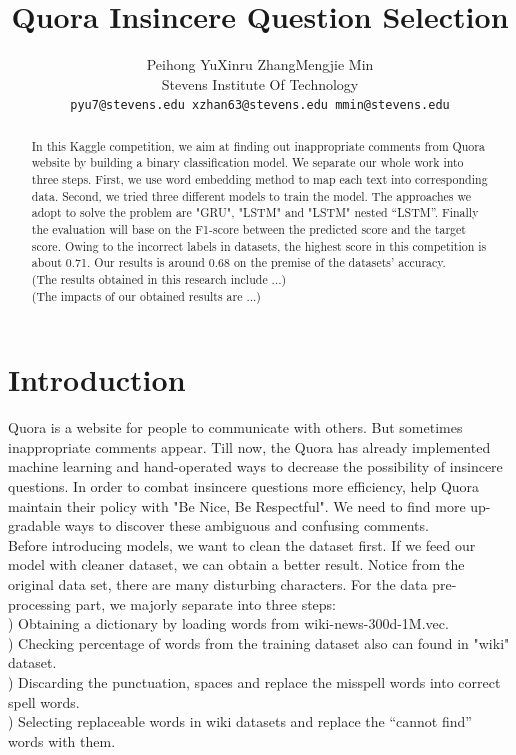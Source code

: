 \documentclass{article}
\title{Quora Insincere Question Selection}
\author{%
  Peihong Yu\quad  Xinru Zhang\quad Mengjie Min\\
  Stevens Institute Of Technology\\
  \texttt{pyu7@stevens.edu\quad
  	xzhan63@stevens.edu\quad
  	mmin@stevens.edu} \\
}
\begin{document}

\maketitle
\begin{abstract}
	In this Kaggle competition, we aim at finding out inappropriate comments from Quora website by building a binary classification model. We separate our whole work into three steps. First, we use word embedding method to map each text into corresponding data. Second, we tried three different models to train the model. The approaches we adopt to solve the problem are "GRU", "LSTM" and "LSTM" nested “LSTM”. Finally the evaluation will base on the F1-score between the predicted score and the target score. Owing to the incorrect labels in datasets, the highest score in this competition is about 0.71. Our results is around 0.68 on the premise of  the datasets’ accuracy.\\
	(The results obtained in this research include ...)\\
	(The impacts of our obtained results are ...)
\end{abstract}
\setlength{\parskip}{0.3em}
\section{Introduction}
\noindent Quora is a website for people to communicate with others. But sometimes inappropriate comments appear. Till now, the Quora has already implemented machine learning and hand-operated ways to decrease the possibility of insincere questions. In order to combat insincere questions more efficiency, help Quora maintain their policy with "Be Nice, Be Respectful". We need to find more up-gradable ways to discover these ambiguous and confusing comments.\\

\noindent Before introducing models, we want to clean the dataset first. If we feed our model with cleaner dataset, we can obtain a better result. Notice from the original data set, there are many disturbing characters. For the data pre-processing part, we majorly separate into three steps: \\

) Obtaining a dictionary by loading words from wiki-news-300d-1M.vec. \\
) Checking percentage of words from the training dataset also can found in "wiki" dataset.\\
) Discarding the punctuation, spaces and replace the misspell words into correct spell words.\\
) Selecting replaceable words in wiki datasets and replace the “cannot find” words with them.\\
\end{document}
